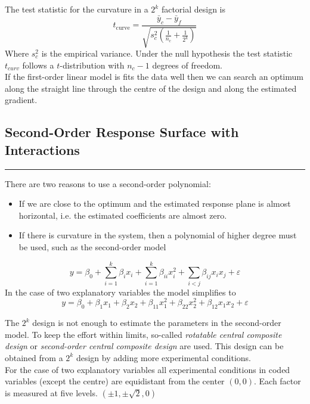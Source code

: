 The test statistic for the curvature in a $2^k$ factorial design is
\begin{equation}
  t_{\text{curve}} = \frac{\bar{y}_c -\bar{y}_f}{\sqrt{s_c^2 \left(\frac{1}{n_c} + \frac{1}{2^k}\right)}}
\end{equation}
Where $s_c^2$ is the empirical variance.
Under the null hypothesis the test statistic $t_{curv}$ follows a $t$-distribution with $n_c - 1$ degrees of freedom.\\

If the first-order linear model is fits the data well then we can search an optimum along the straight line through the centre of the design and along the estimated gradient.

\subsection{Second-Order Response Surface with Interactions}
\noindent\rule[\linienAbstand]{\linewidth}{\linienDicke}
There are two reasons to use a second-order polynomial:\\
\begin{itemize}
  \item If we are close to the optimum and the estimated response plane is almost horizontal, i.e. the estimated coefficients are almost zero.\\
  \item If there is curvature in the system, then a polynomial of higher degree must be used, such as the second-order model
\end{itemize}
\begin{equation}
  y = \beta_0 + \sum_{i=1}^k \beta_i x_i + \sum_{i=1}^k \beta_{ii} x_i^2 + \sum_{i<j} \beta_{ij} x_i x_j + \varepsilon
\end{equation}
In the case of two explanatory variables the model simplifies to
\begin{equation}
  y = \beta_0 + \beta_1 x_1 + \beta_2 x_2 + \beta_{11} x_{1}^2 + \beta_{22}x_{2}^2 + \beta_{12} x_1 x_2 + \varepsilon
\end{equation}

The $2^k$ design is not enough to estimate the parameters in the second-order model. To keep the effort within limits, so-called \emph{rotatable central composite design} or \emph{second-order central composite design} are used. This design can be obtained from a $2^k$ design by adding more experimental conditions.\\
For the case of two explanatory variables all experimental conditions in coded variables (except the centre) are equidistant from the center $(0, 0)$. Each factor is measured at five levels. $(\pm 1, \pm \sqrt{2}, 0)$\\

